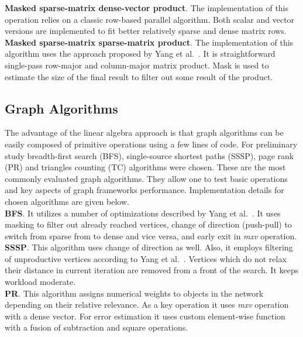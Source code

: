 \textbf{Masked sparse-matrix dense-vector product}. The implementation of this operation relies on a classic row-based parallel algorithm. Both scalar and vector versions are implemented to fit better relatively sparse and dense matrix rows.\\

\textbf{Masked sparse-matrix sparse-matrix product}. The implementation of this algorithm uses the approach proposed by Yang et al.~\cite{yang2019graphblast}. It is straightforward single-pass row-major and column-major matrix product. Mask is used to estimate the size of the final result to filter out some result of the product. 

\subsection{Graph Algorithms}

The advantage of the linear algebra approach is that graph algorithms can be easily composed of primitive operations using a few lines of code. For preliminary study breadth-first search (BFS), single-source shortest paths (SSSP), page rank (PR) and triangles counting (TC) algorithms were chosen. These are the most commonly evaluated graph algorithms. They allow one to test basic operations and key aspects of graph frameworks performance. Implementation details for chosen algorithms are given below.\\

\textbf{BFS}. It utilizes a number of optimizations described by Yang et al.~\cite{article:pushpull}. It uses masking to filter out already reached vertices, change of direction (push-pull) to switch from sparse from to dense and vice versa, and early exit in \textit{mxv} operation.\\

\textbf{SSSP}. This algorithm uses change of direction as well. Also, it employs filtering of unproductive vertices according to Yang et al.~\cite{yang2019graphblast}. Vertices which do not relax their distance in current iteration are removed from a front of the search. It keeps workload moderate.\\

\textbf{PR}. This algorithm assigns numerical weights to objects in the network depending on their relative relevance. As a key operation it uses \textit{mxv} operation with a dense vector. For error estimation it uses custom element-wise function with a fusion of subtraction and square operations.\\  

